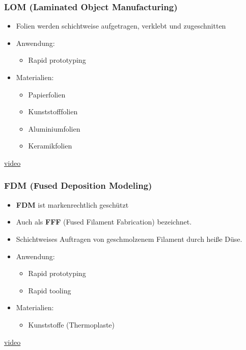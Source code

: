 \begin{frame}
  \frametitle{LOM (Laminated Object Manufacturing)}
  \pause
  \begin{itemize}
    \item Folien werden schichtweise aufgetragen, verklebt und zugeschnitten \pause
    \item Anwendung:
    \begin{itemize}
      \item Rapid prototyping \pause
    \end{itemize}
    \item Materialien:
    \begin{itemize}
      \item Papierfolien
      \item Kunststofffolien
      \item Aluminiumfolien
      \item Keramikfolien \pause
    \end{itemize}
  \end{itemize}
  \href{https://youtu.be/6C7bjzIW610}{video}
\end{frame}

\begin{frame}
  \frametitle{FDM (Fused Deposition Modeling)}
  \pause
  \begin{itemize}
    \item \textbf{FDM} ist markenrechtlich geschützt \pause
    \item Auch als \textbf{FFF} (Fused Filament Fabrication) bezeichnet. \pause
    \item Schichtweises Auftragen von geschmolzenem Filament durch heiße Düse. \pause
    \item Anwendung:
    \begin{itemize}
      \item Rapid prototyping
      \item Rapid tooling \pause
    \end{itemize}
    \item Materialien:
    \begin{itemize}
      \item Kunststoffe (Thermoplaste)
    \end{itemize}
  \end{itemize}
  \href{https://youtu.be/aubLuCFIejc}{video}
\end{frame}
